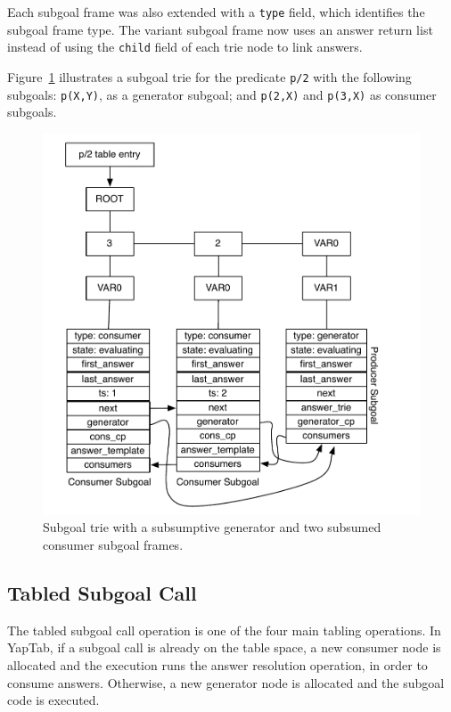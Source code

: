 Each subgoal frame was also extended with a \texttt{type} field, which identifies the subgoal frame type.
The variant subgoal frame now uses an answer return list instead of using the \texttt{child} field of
each trie node to link answers.

Figure~\ref{fig:subgoal_frames} illustrates a subgoal trie for the predicate \texttt{p/2}
with the following subgoals: \texttt{p(X,Y)}, as a generator subgoal; and \texttt{p(2,X)} and
\texttt{p(3,X)} as consumer subgoals.

\begin{figure}[h]
  \centering
    \includegraphics[scale=0.6]{subgoal_frames.pdf}
  \caption{Subgoal trie with a subsumptive generator and two subsumed consumer subgoal frames.}
  \label{fig:subgoal_frames}
\end{figure}

\subsection{Tabled Subgoal Call}

The tabled subgoal call operation is one of the four main tabling operations. In YapTab,
if a subgoal call is already on the table space, a new consumer node is allocated and
the execution runs the answer resolution operation, in order to consume answers.
Otherwise, a new generator node is allocated and the subgoal code is executed.

